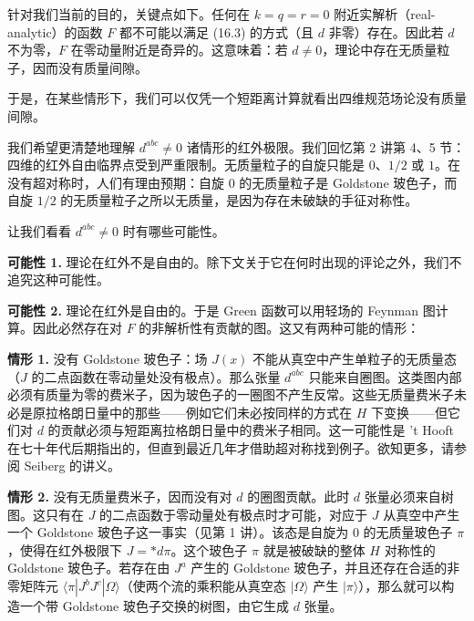 

针对我们当前的目的，关键点如下。任何在 $k=q=r=0$ 附近实解析（real-analytic）的函数 $F$ 都不可能以满足 (16.3) 的方式（且 $d$ 非零）存在。因此若 $d$ 不为零，$F$ 在零动量附近是奇异的。这意味着：若 $d\ne0$，理论中存在无质量粒子，因而没有质量间隙。

于是，在某些情形下，我们可以仅凭一个短距离计算就看出四维规范场论没有质量间隙。

我们希望更清楚地理解 $d^{abc}\ne0$ 诸情形的红外极限。我们回忆第 2 讲第 4、5 节：四维的红外自由临界点受到严重限制。无质量粒子的自旋只能是 $0$、$1/2$ 或 $1$。在没有超对称时，人们有理由预期：自旋 $0$ 的无质量粒子是 Goldstone 玻色子，而自旋 $1/2$ 的无质量粒子之所以无质量，是因为存在未破缺的手征对称性。

让我们看看 $d^{abc}\ne0$ 时有哪些可能性。

\textbf{可能性 1.} 理论在红外不是自由的。除下文关于它在何时出现的评论之外，我们不追究这种可能性。

\textbf{可能性 2.} 理论在红外是自由的。于是 Green 函数可以用轻场的 Feynman 图计算。因此必然存在对 $F$ 的非解析性有贡献的图。这又有两种可能的情形：


\textbf{情形 1.} 没有 Goldstone 玻色子：场 $J(x)$ 不能从真空中产生单粒子的无质量态（$J$ 的二点函数在零动量处没有极点）。那么张量 $d^{abc}$ 只能来自圈图。这类图内部必须有质量为零的费米子，因为玻色子的一圈图不产生反常。这些无质量费米子未必是原拉格朗日量中的那些——例如它们未必按同样的方式在 $H$ 下变换——但它们对 $d$ 的贡献必须与短距离拉格朗日量中的费米子相同。这一可能性是 't Hooft 在七十年代后期指出的，但直到最近几年才借助超对称找到例子。欲知更多，请参阅 Seiberg 的讲义。

\textbf{情形 2.} 没有无质量费米子，因而没有对 $d$ 的圈图贡献。此时 $d$ 张量必须来自树图。这只有在 $J$ 的二点函数于零动量处有极点时才可能，对应于 $J$ 从真空中产生一个 Goldstone 玻色子这一事实（见第 1 讲）。该态是自旋为 $0$ 的无质量玻色子 $\pi$，使得在红外极限下 $J=*d\pi$。这个玻色子 $\pi$ 就是被破缺的整体 $H$ 对称性的 Goldstone 玻色子。若存在由 $J^a$ 产生的 Goldstone 玻色子，并且还存在合适的非零矩阵元 $\langle\pi|J^bJ^c|\Omega\rangle$（使两个流的乘积能从真空态 $|\Omega\rangle$ 产生 $|\pi\rangle$），那么就可以构造一个带 Goldstone 玻色子交换的树图，由它生成 $d$ 张量。

